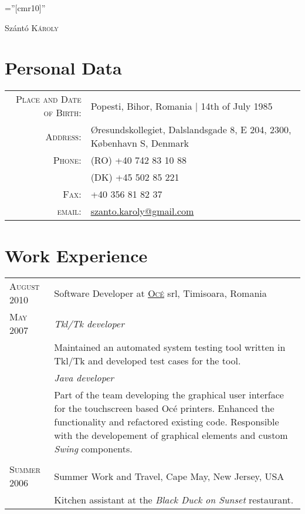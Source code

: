 \documentclass[a4paper,10pt]{article}
\begin{document}
\pagestyle{plain} %

\font\fb=''[cmr10]'' %

 
\par{\centering
		{\Huge Sz\'ant\'o \textsc{K\'aroly}
	}\bigskip\par}
	
\section{Personal Data}

\begin{tabular}{rl}
    \textsc{Place and Date of Birth:} & Popesti, Bihor, Romania  | 14th of July
    1985 \\ \textsc{Address:}   & Øresundskollegiet, Dalslandsgade 8, E 204,
    2300, København S, Denmark \\ 
    \textsc{Phone:}     & (RO) +40 742 83 10 88\\
    					& (DK) +45 502 85 221\\
    \textsc{Fax:}		& +40 356 81 82 37\\
    \textsc{email:}     &
    \href{mailto:szanto.karoly@gmail.com}{szanto.karoly@gmail.com}
\end{tabular}

\section{Work Experience}
\begin{tabular}{p{2.5cm}|p{11cm}}
 \raggedleft \textsc{August 2010} & Software Developer at
 \textsc{\href{http://www3.oce.com/ro/}{Oc\'e}} srl, Timisoara, Romania
 \\\raggedleft \textsc{May 2007}&\emph{Tkl/Tk
 developer}\\&\footnotesize{Maintained an automated system testing tool written in Tkl/Tk and developed test cases for the tool.}\\&\emph{Java
 developer}\\&\footnotesize{Part of the team developing the graphical user
 interface for the touchscreen based Oc\'e printers. Enhanced the functionality
 and refactored existing code. Responsible with the developement of graphical
 elements and custom \emph{Swing} components.}
\\\multicolumn{2}{c}{} \\
\raggedleft \textsc{Summer 2006} & Summer Work and Travel, Cape May, New Jersey,
USA\\&\footnotesize{Kitchen assistant at the \emph{Black Duck on Sunset}
restaurant.}
\end{tabular}
\end{document}
